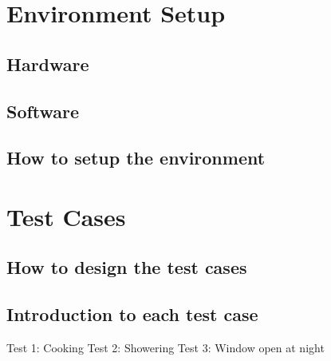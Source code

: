 \section{Environment Setup}
\subsection{Hardware}
\subsection{Software}
\subsection{How to setup the environment}

\section{Test Cases}
\subsection{How to design the test cases}
\subsection{Introduction to each test case}

Test 1: Cooking
Test 2: Showering
Test 3: Window open at night